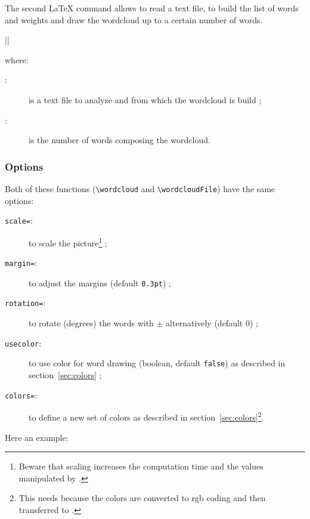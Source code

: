 \documentclass[english]{ltxdoc}
\begin{document}
The second \LaTeX{} command allows to read a text file, to build the list of
words and weights and draw the wordcloud up to a certain number of words.

\commande||\smallskip\index{\wordcloudFile@\lstinline+\wordcloudFile+}

where:
\begin{description}
  \item[:] is a text file to analyze and from which the
  wordcloud is build ;
  \item[:] is the number of words composing the wordcloud.  
\end{description}

\subsubsection{Options}

Both of these functions (\lstinline+\wordcloud+ and \lstinline+\wordcloudFile+)
have the same options:

\begin{description}
  \item[\texttt{scale=}:] to scale the picture\footnote{Beware
  that scaling increases the computation time and the values manipulated by
  .} ;
  \item[\texttt{margin=}:] to adjust the margins
  (default \lstinline+0.3pt+) ;
  \item[\texttt{rotation=}:] to rotate (degrees) the words with
  $\pm$ alternatively (default 0) ;
  \item[\texttt{usecolor}:] to use color for word drawing (boolean, default
  \lstinline+false+) as described in section~\ref{sec:colors} ;
  \item[\texttt{colors=}:] to define a new
  set of colors as described in section~\ref{sec:colors}\footnote{This needs
   because the colors are converted to rgb coding and then
  transferred to .}.
\end{description}
  

Here an example:
\begin{ExempleLaTeX} 
\end{ExempleLaTeX}
\end{document}
